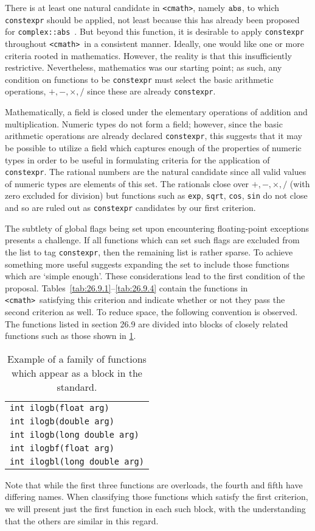 \documentclass[prd,preprint,amsmath,amssymb,nofootinbib,eqsecnum]{revtex4-1}
\newcommand{\constexpr}{\code{constexpr}\xspace}
\newcommand{\code}[1]{{\tt #1}}
\newcommand{\header}[1]{{\tt <#1>}}
\newcommand{\cmath}{\header{cmath}}
\begin{document}
There is at least one natural candidate in \header{cmath}, namely $\code{abs}$,
to which \constexpr should be applied, not least because this has already been proposed
for \code{complex::abs}~\cite{AP-complex}. But beyond this function, it is desirable to
apply \constexpr throughout \cmath\ in a consistent manner. Ideally, one would
like one or more criteria rooted in mathematics. However, the reality is that
this insufficiently restrictive. Nevertheless, mathematics was our starting
point; as such, any condition on functions to be \constexpr must select the
basic arithmetic operations, $+,-,\times,/$ since these are already \constexpr.

Mathematically, a field is closed under the elementary operations of addition
and multiplication.
Numeric types do not form a field; however, since the basic arithmetic
operations are already declared \constexpr, this suggests that it may be
possible to utilize a field which captures enough of the properties of numeric
types in order to be useful in formulating criteria for the application of
\constexpr. The rational numbers are the natural candidate since all valid
values of numeric types are elements of this set. The rationals close over
$+,-,\times,/$ (with zero excluded for division)
but functions such as \code{exp}, \code{sqrt}, \code{cos},
\code{sin} do not close and so are ruled out as \constexpr candidates
by our first criterion.

The subtlety of global flags being set upon encountering floating-point
exceptions presents a challenge. If all functions which can set such flags are
excluded from the list to tag \constexpr, then the remaining list is rather
sparse. To achieve something more useful suggests expanding the set to include
those functions which are `simple enough'. These considerations lead to the
first condition of the proposal.
Tables~\ref{tab:26.9.1}--\ref{tab:26.9.4} contain the functions in \cmath\
satisfying this criterion and indicate whether or not they pass the second
criterion as well. To reduce space, the following convention is observed. The
functions listed in section 26.9 are divided into blocks of closely related
functions such as those shown in \ref{tab:example}. 
\begin{table}
	\begin{tabular}{l}
		\code{int ilogb(float arg)}
	\\
		\code{int ilogb(double arg)}
	\\
		\code{int ilogb(long double arg)}
	\\
		\code{int ilogbf(float arg)}
	\\
		\code{int ilogbl(long double arg)}
	\end{tabular}
\caption{Example of a family of functions which appear as a block in the standard.}
\label{tab:example}
\end{table}
Note that while the first three functions are overloads, the fourth and fifth
have differing names.  When classifying those functions which satisfy the first
criterion, we will present just the first function in each such block, with the
understanding that the others are similar in this regard.
\end{document}
